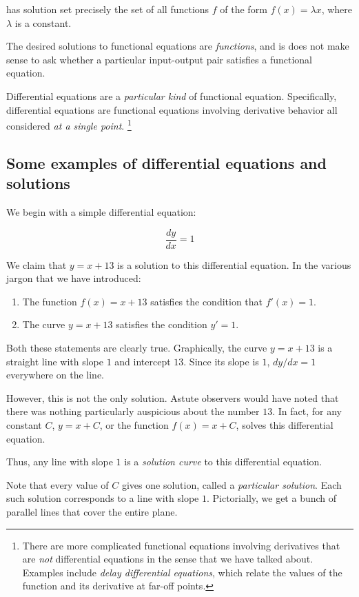 \documentclass{amsart}
\begin{document}
has solution set precisely the set of all functions $f$ of the form
$f(x) = \lambda x$, where $\lambda$ is a constant.

The desired solutions to functional equations are {\em functions}, and
is does not make sense to ask whether a particular input-output pair
satisfies a functional equation.

Differential equations are a {\em particular kind} of functional
equation. Specifically, differential equations are functional
equations involving derivative behavior all considered {\em at a
single point}. \footnote{There are more complicated functional
equations involving derivatives that are {\em not} differential
equations in the sense that we have talked about. Examples include
{\em delay differential equations}, which relate the values of the
function and its derivative at far-off points.}

\subsection{Some examples of differential equations and solutions}

We begin with a simple differential equation:

$$\frac{dy}{dx} = 1$$

We claim that $y = x + 13$ is a solution to this differential
equation. In the various jargon that we have introduced:

\begin{enumerate}
\item The function $f(x) = x + 13$ satisfies the condition that $f'(x)
  = 1$.
\item The curve $y = x + 13$ satisfies the condition $y' = 1$.
\end{enumerate}

Both these statements are clearly true. Graphically, the curve $y = x
+ 13$ is a straight line with slope $1$ and intercept $13$. Since its
slope is $1$, $dy/dx = 1$ everywhere on the line.

However, this is not the only solution. Astute observers would have
noted that there was nothing particularly auspicious about the number
$13$. In fact, for any constant $C$, $y = x + C$, or the function
$f(x) = x + C$, solves this differential equation.

Thus, any line with slope $1$ is a {\em solution curve} to this
differential equation.

Note that every value of $C$ gives one solution, called a {\em
particular solution}. Each such solution corresponds to a line with
slope $1$. Pictorially, we get a bunch of parallel lines that cover
the entire plane.
\end{document}
